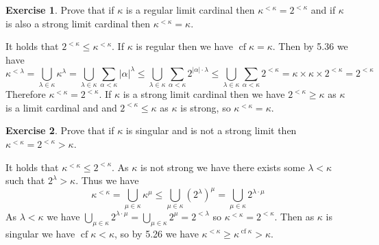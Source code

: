 \documentclass{article}
\theoremstyle{definition}
\newtheorem{exer}{Exercise}[section]
\DeclareMathOperator{\cf}{cf}
\newcommand{\abs}[1]{\lvert#1\rvert}
\newlength{\defparindent}
\newenvironment{answer}
    {\begin{mdframed}[backgroundcolor=gray!15, linewidth=0pt] \setlength{\parindent}{\defparindent}}
    {\end{mdframed}}
\begin{document}
\begin{exer}
    Prove that if $\kappa$ is a regular limit cardinal then $\kappa^{< \kappa} = 2^{< \kappa}$ and if $\kappa$ is also a strong limit cardinal then $\kappa^{< \kappa} = \kappa$.
    \begin{answer}
        It holds that $2^{< \kappa} \le \kappa^{< \kappa}$. If $\kappa$ is regular then we have $\cf \kappa = \kappa$. Then by 5.36 we have 
        \[
            \kappa^{< \lambda} 
            =
            \bigcup_{\lambda \in \kappa} \kappa^{\lambda}
            =
            \bigcup_{\lambda \in \kappa} \sum_{\alpha < \kappa} \abs{\alpha}^{\lambda}
            \le
            \bigcup_{\lambda \in \kappa} \sum_{\alpha < \kappa} 2^{\abs{\alpha} \cdot \lambda}
            \le
            \bigcup_{\lambda \in \kappa} \sum_{\alpha < \kappa} 2^{< \kappa}
            =
            \kappa \times \kappa \times 2^{< \kappa} 
            =
            2^{< \kappa} 
        \]
        Therefore $\kappa^{< \kappa} = 2^{< \kappa}$. If $\kappa$ is a strong limit cardinal then we have $2^{< \kappa} \ge \kappa$ as $\kappa$ is a limit cardinal and and $2^{< \kappa} \le \kappa$ as $\kappa$ is strong, so $\kappa^{< \kappa} = \kappa$.
    \end{answer}
\end{exer}

\newpage

\begin{exer}
    Prove that if $\kappa$ is singular and is not a strong limit then $\kappa^{< \kappa} = 2^{< \kappa} > \kappa$. 
    \begin{answer}
        It holds that $\kappa^{< \kappa} \le 2^{< \kappa}$. As $\kappa$ is not strong we have there exists some $\lambda < \kappa$ such that $2^\lambda > \kappa$. Thus we have 
        \[
            \kappa^{< \kappa} 
            = 
            \bigcup_{\mu \in \kappa} \kappa^{\mu} 
            \le 
            \bigcup_{\mu \in \kappa} (2^\lambda)^{\mu}
            =
            \bigcup_{\mu \in \kappa} 2^{\lambda \cdot \mu}
        \]
        As $\lambda < \kappa$ we have $\bigcup_{\mu \in \kappa} 2^{\lambda \cdot \mu} = \bigcup_{\mu \in \kappa} 2^{\mu} = 2^{< \lambda}$ so $\kappa^{< \kappa} = 2^{< \kappa}$. Then as $\kappa$ is singular we have $\cf \kappa < \kappa$, so by 5.26 we have  $\kappa^{< \kappa} \ge \kappa^{\cf \kappa} > \kappa$.
    \end{answer}
\end{exer}
\end{document}
